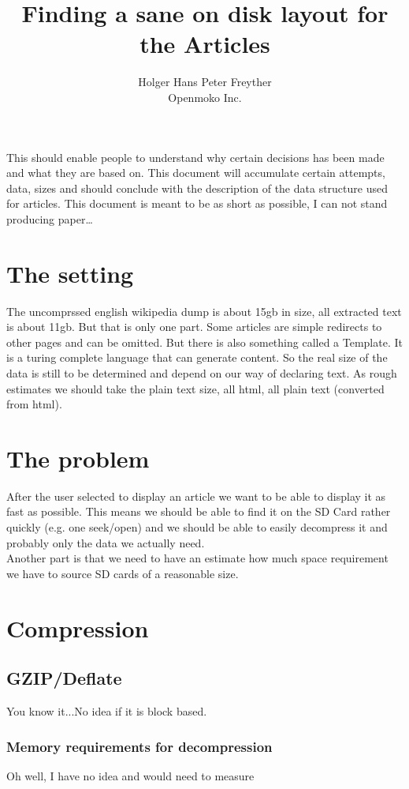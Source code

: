 \documentclass{article}
\begin{document}
\title{Finding a sane on disk layout for the Articles}
\author{Holger Hans Peter Freyther\\
Openmoko Inc.
}
\maketitle
This should enable people to understand why certain decisions has been made
and what they are based on. This document will accumulate certain attempts,
data, sizes and should conclude with the description of the data structure
used for articles. This document is meant to be as short as possible, I can
not stand producing paper\ldots

\section{The setting}
The uncomprssed english wikipedia dump is about 15gb in size, all extracted
text is about 11gb. But that is only one part. Some articles are simple redirects
to other pages and can be omitted. But there is also something called a Template.
It is a turing complete language that can generate content. So the real size
of the data is still to be determined and depend on our way of declaring
text. As rough estimates we should take the plain text size, all html, all
plain text (converted from html).


\section{The problem}
After the user selected to display an article we want to be able to display it
as fast as possible. This means we should be able to find it on the SD Card
rather quickly (e.g. one seek/open) and we should be able to easily decompress
it and probably only the data we actually need.\\
Another part is that we need to have an estimate how much space requirement
we have to source SD cards of a reasonable size.

\section{Compression}
\subsection{GZIP/Deflate}
You know it...No idea if it is block based.

\subsubsection{Memory requirements for decompression}
Oh well, I have no idea and would need to measure
\end{document}
